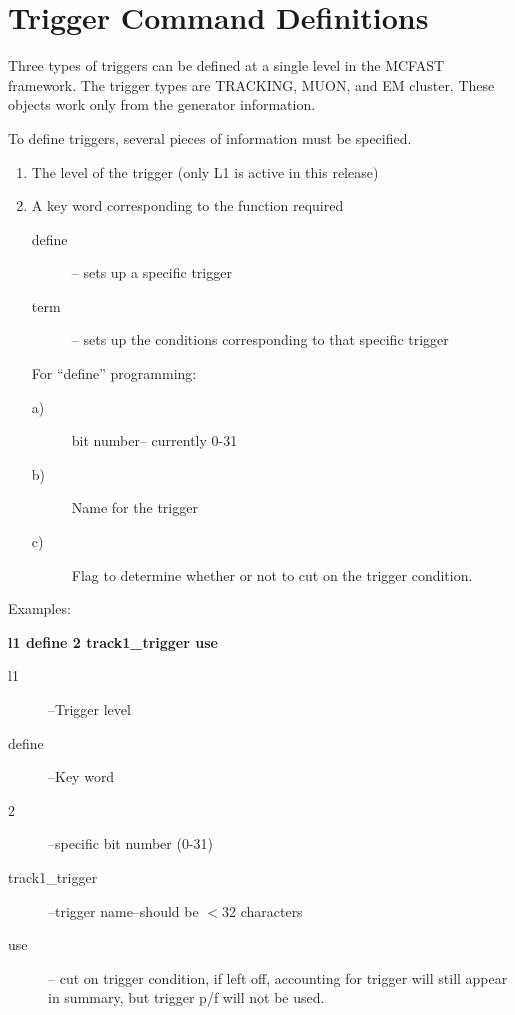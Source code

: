 \filbreak

\section{Trigger Command Definitions}


Three types of triggers can be defined at a single level in 
the MCFAST framework.  The trigger types are TRACKING, MUON, and EM cluster.
These objects work only from the generator information.

To define triggers, several pieces of information must be specified.
\begin{enumerate}
 \item The level of the trigger (only L1 is active in this release)
 \item A key word corresponding to the function required 
 \begin{description}
   \item[define] -- sets up a specific trigger
   \item[term]   -- sets up the conditions corresponding to that specific trigger
 \end{description}
 
For ``define'' programming:

 \begin{description}
   \item[a)] bit number-- currently 0-31
   \item[b)] Name for the trigger
   \item[c)] Flag to determine whether or not to cut on the trigger condition.
 \end{description}
\end{enumerate}

Examples:

{\bf l1 define 2 track1\_trigger use}

\begin{description}

\item[ l1] --Trigger level
\item[ define ] --Key word
\item[ 2 ] --specific bit number (0-31)
\item[ track1\_trigger] --trigger name--should be $<$32 characters
\item[ use] -- cut on trigger condition, if left off, 
accounting for trigger will still appear
in summary, but trigger p/f will not be used.
\end{description}

